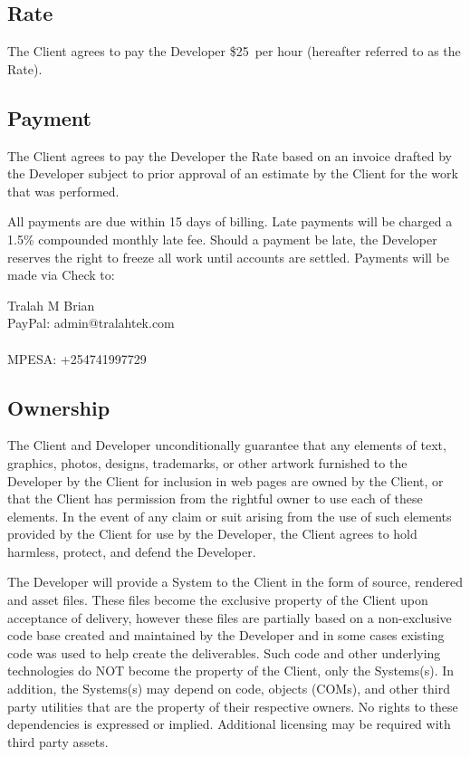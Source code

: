 \documentclass[a4paper,12pt]{article} %
\makeatletter
\newcommand{\HourlyRate}{\$25}
\newcommand{\PayeeName}{Tralah M Brian}
\newcommand{\PaymentAddressLineOne}{PayPal: admin@tralahtek.com}
\newcommand{\PaymentAddressLineTwo}{[SIDIAN BANK A/C No:]}
\newcommand{\PaymentAddressLineThree}{MPESA: +254741997729}
\newcommand{\PaymentAddressLineFour}{[EQUITY BANK A/C No:]}
\makeatother
\begin{document}
\subsection{Rate}

The Client agrees to pay the Developer \HourlyRate~per hour (hereafter referred to as the Rate).


\subsection{Payment}

The Client agrees to pay the Developer the Rate based on an invoice drafted by the Developer subject to prior approval of an estimate by the Client for the work that was performed.

All payments are due within 15 days of billing. Late payments will be charged a 1.5\% compounded monthly late fee. Should a payment be late, the Developer reserves the right to freeze all work until accounts are settled. Payments will be made via Check to:

\PayeeName \\
\PaymentAddressLineOne \\
\PaymentAddressLineTwo \\
\PaymentAddressLineThree \\
\PaymentAddressLineFour


\subsection{Ownership}

The Client and Developer unconditionally guarantee that any elements of text, graphics, photos, designs, trademarks, or other artwork furnished to the Developer by the Client for inclusion in web pages are owned by the Client, or that the Client has permission from the rightful owner to use each of these elements. In the event of any claim or suit arising from the use of such elements provided by the Client for use by the Developer, the Client agrees to hold harmless, protect, and defend the Developer.

The Developer will provide a System to the Client in the form of source, rendered and asset files. These files become the exclusive property of the Client upon acceptance of delivery, however these files are partially based on a non-exclusive code base created and maintained by the Developer and in some cases existing code was used to help create the deliverables. Such code and other underlying technologies do NOT become the property of the Client, only the Systems(s). In addition, the Systems(s) may depend on code, objects (COMs), and other third party utilities that are the property of their respective owners. No rights to these dependencies is expressed or implied. Additional licensing may be required with third party assets.
\end{document}
